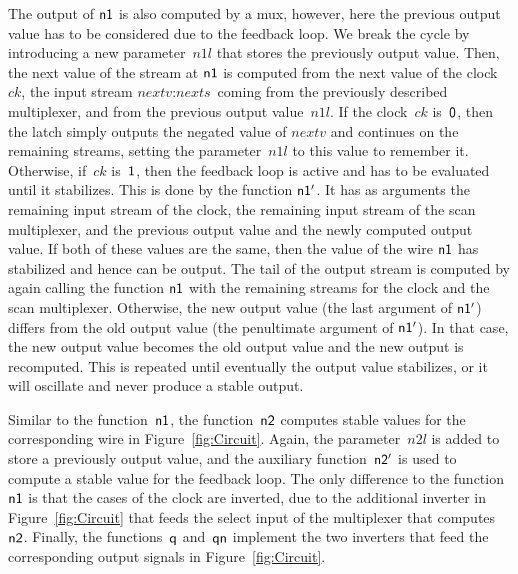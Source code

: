 \documentclass{eptcs}
\begin{document}
The output of $\mathsf{n1}$ is also computed by a mux, however, here the previous
output value has to be considered due to the feedback loop. We break the cycle
by introducing a new parameter~$\textit{n1l}$ that stores the previously output
value.
Then, the next value of the stream at $\mathsf{n1}$ is computed
from the next value of the clock~$ck$, the input stream
$\textit{nextv}:\textit{nexts}$ coming from the previously described
multiplexer, and from the previous output value~$\textit{n1l}$.
If the clock~$ck$ is~$\mathsf{0}$, then the latch simply outputs the negated value of
$\textit{nextv}$ and continues on the remaining streams, setting the
parameter~$\textit{n1l}$ to this value to remember it.
Otherwise, if~$ck$ is~$\mathsf{1}$, then the feedback loop is active and has to be
evaluated until it stabilizes. This is done by the function $\mathsf{n1'}$.
It has as arguments the remaining input stream of the clock, the remaining input
stream of the scan multiplexer, and the previous output value and the newly
computed output value. If both of these values are the same, then the value of
the wire $\mathsf{n1}$ has stabilized and hence can be output. The tail of the
output stream is computed by again calling the function $\mathsf{n1}$ with the
remaining streams for the clock and the scan multiplexer.
Otherwise, the new output value (the last argument of $\mathsf{n1'}$) differs from
the old output value (the penultimate argument of $\mathsf{n1'}$). In that case,
the new output value becomes the old output value and the new output is
recomputed. This is repeated until eventually the output value stabilizes, or it
will oscillate and never produce a stable output.

Similar to the function~$\mathsf{n1}$, the function~$\mathsf{n2}$ computes stable
values for the corresponding wire in Figure~\ref{fig:Circuit}. Again, the
parameter~$\textit{n2l}$ is added to store a previously output value, and the
auxiliary function~$\mathsf{n2'}$ is used to compute a stable value for the
feedback loop. The only difference to the function~$\mathsf{n1}$ is that the cases
of the clock are inverted, due to the additional inverter in
Figure~\ref{fig:Circuit} that feeds the select input of the multiplexer that
computes~$\mathsf{n2}$.
Finally, the functions~$\mathsf{q}$ and~$\mathsf{qn}$ implement the two inverters
that feed the corresponding output signals in Figure~\ref{fig:Circuit}.
\end{document}
